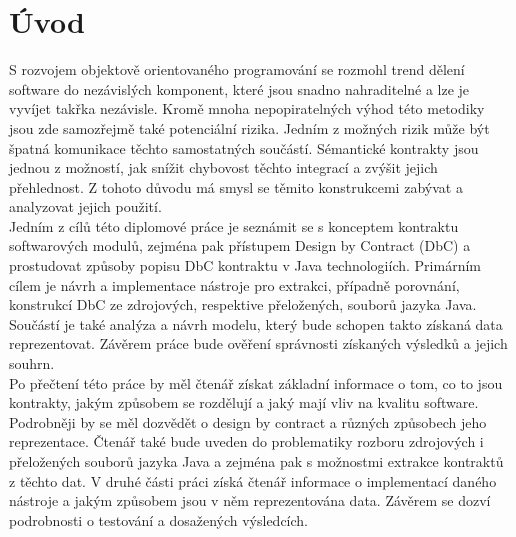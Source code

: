 \chapter{Úvod}

S rozvojem objektově orientovaného programování se rozmohl trend dělení software do nezávislých komponent, které jsou snadno nahraditelné a lze je vyvíjet takřka nezávisle. Kromě mnoha nepopiratelných výhod této metodiky jsou zde samozřejmě také potenciální rizika. Jedním z možných rizik může být špatná komunikace těchto samostatných součástí. Sémantické kontrakty jsou jednou z možností, jak snížit chybovost těchto integrací a zvýšit jejich přehlednost. Z tohoto důvodu má smysl se těmito konstrukcemi zabývat a analyzovat jejich použití.\\

Jedním z cílů této diplomové práce je seznámit se s konceptem kontraktu softwarových modulů, zejména pak přístupem Design by Contract (DbC) a prostudovat způsoby popisu DbC kontraktu v Java technologiích. Primárním cílem je návrh a implementace nástroje pro extrakci, případně porovnání, konstrukcí DbC ze zdrojových, respektive přeložených, souborů jazyka Java. Součástí je také analýza a návrh modelu, který bude schopen takto získaná data reprezentovat. Závěrem práce bude ověření správnosti získaných výsledků a jejich souhrn.\\ 

Po přečtení této práce by měl čtenář získat základní informace o tom, co to jsou kontrakty, jakým způsobem se rozdělují a jaký mají vliv na kvalitu software. Podrobněji by se měl dozvědět o design by contract a různých způsobech jeho reprezentace. Čtenář také bude uveden do problematiky rozboru zdrojových i přeložených souborů jazyka Java a zejména pak s možnostmi extrakce kontraktů z těchto dat. V druhé části práci získá čtenář informace o implementací daného nástroje a jakým způsobem jsou v něm reprezentována data. Závěrem se dozví podrobnosti o testování a dosažených výsledcích.